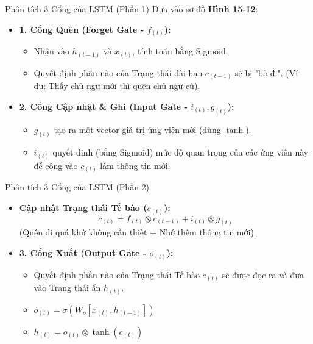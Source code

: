 \documentclass[aspectratio=169]{beamer}
\begin{document}
\begin{frame}{Phân tích 3 Cổng của LSTM (Phần 1)}
    Dựa vào sơ đồ \textbf{Hình 15-12}:
    \begin{itemize}
        \item \textbf{1. Cổng Quên (Forget Gate - $f_{(t)}$):} 
        \begin{itemize}
            \item Nhận vào $h_{(t-1)}$ và $x_{(t)}$, tính toán bằng Sigmoid.
            \item Quyết định phần nào của Trạng thái dài hạn $c_{(t-1)}$ sẽ bị "bỏ đi". (Ví dụ: Thấy chủ ngữ mới thì quên chủ ngữ cũ).
        \end{itemize}
        \item \textbf{2. Cổng Cập nhật \& Ghi (Input Gate - $i_{(t)}, g_{(t)}$):}
        \begin{itemize}
            \item $g_{(t)}$ tạo ra một vector giá trị ứng viên mới (dùng $\tanh$).
            \item $i_{(t)}$ quyết định (bằng Sigmoid) mức độ quan trọng của các ứng viên này để cộng vào $c_{(t)}$ làm thông tin mới.
        \end{itemize}
    \end{itemize}
\end{frame}

\begin{frame}{Phân tích 3 Cổng của LSTM (Phần 2)}
    \begin{itemize}
        \item \textbf{Cập nhật Trạng thái Tế bào ($c_{(t)}$):}
        $$ c_{(t)} = f_{(t)} \otimes c_{(t-1)} + i_{(t)} \otimes g_{(t)} $$
        (Quên đi quá khứ không cần thiết + Nhớ thêm thông tin mới).
        \vspace{0.5cm}
        \item \textbf{3. Cổng Xuất (Output Gate - $o_{(t)}$):}
        \begin{itemize}
            \item Quyết định phần nào của Trạng thái Tế bào $c_{(t)}$ sẽ được đọc ra và đưa vào Trạng thái ẩn $h_{(t)}$.
            \item $o_{(t)} = \sigma(W_o [x_{(t)}, h_{(t-1)}])$
            \item $h_{(t)} = o_{(t)} \otimes \tanh(c_{(t)})$
        \end{itemize}
    \end{itemize}
\end{frame}
\end{document}
